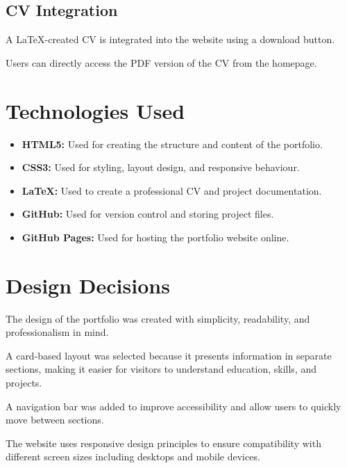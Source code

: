\documentclass[12pt,a4paper]{article}
\begin{document}
\subsection{CV Integration}


A LaTeX-created CV is integrated into the website using a download button.

Users can directly access the PDF version of the CV from the homepage.



\section{Technologies Used}


\begin{itemize}


\item \textbf{HTML5:}
Used for creating the structure and content of the portfolio.


\item \textbf{CSS3:}
Used for styling, layout design, and responsive behaviour.


\item \textbf{LaTeX:}
Used to create a professional CV and project documentation.


\item \textbf{GitHub:}
Used for version control and storing project files.


\item \textbf{GitHub Pages:}
Used for hosting the portfolio website online.


\end{itemize}





\section{Design Decisions}


The design of the portfolio was created with simplicity, readability, and professionalism in mind.

A card-based layout was selected because it presents information in separate sections, making it easier for visitors to understand education, skills, and projects.

A navigation bar was added to improve accessibility and allow users to quickly move between sections.

The website uses responsive design principles to ensure compatibility with different screen sizes including desktops and mobile devices.
\end{document}
